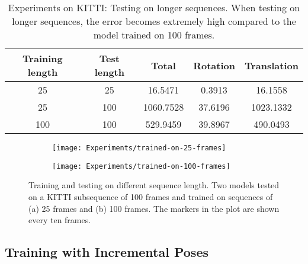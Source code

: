 		
			\begin{table}[tb]
				\small
				\begin{center}
					\begin{tabular}{|c|c||c|c|c|}
						\hline
						Training length & Test length 	& Total 	& Rotation	& Translation	\\ \hline
						25				& 25			& 16.5471	& 0.3913	& 16.1558		\\ \hline
						25				& 100			& 1060.7528	& 37.6196	& 1023.1332		\\ \hline
						100				& 100			& 529.9459	& 39.8967	& 490.0493		\\ \hline
					\end{tabular}
				\end{center}
				\caption[Experiments on KITTI: Testing on longer sequences]
						{Experiments on KITTI: Testing on longer sequences. 
						 When testing on longer sequences, the error becomes extremely high compared to the model trained on 100 frames.
						 \label{tbl:kitti-testing-on-longer-sequences}}
			\end{table}
	
			\begin{figure}
				\centering
				\begin{subfigure}[b]{0.5\linewidth}
					\centering
					\texttt{[image: Experiments/trained-on-25-frames]}
					\caption{
						\label{fig:0}
					}
				\end{subfigure}%
				\begin{subfigure}[b]{0.5\linewidth}
					\centering
					\texttt{[image: Experiments/trained-on-100-frames]}
					\caption{
						\label{fig:1}
					}
				\end{subfigure}%
				\caption[Training and testing on different sequence length]
						{Training and testing on different sequence length. 
						 Two models tested on a KITTI subsequence of 100 frames and trained on sequences of (a) 25 frames and (b) 100 frames. 
						 The markers in the plot are shown every ten frames.
						 \label{fig:kitti-testing-on-longer-sequences}}
			\end{figure}
	
	
		\subsection{Training with Incremental Poses}
	
